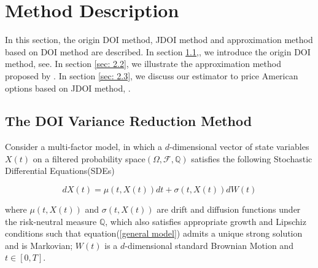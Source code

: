 \chapter{Method Description}

In this section, the origin DOI method, JDOI method and approximation method based on DOI method are described. In section \ref{sec: 2.1},, we introduce the origin DOI method, see\cite{heath_monte_nodate}. In section \ref{sec: 2.2}, we illustrate the approximation method proposed by \cite{kristensen_adding_2011}. In section \ref{sec: 2.3}, we discuss our estimator to price American options based on JDOI method, \cite{auster_jdoi_2021}.

\section{The DOI Variance Reduction Method}
\label{sec: 2.1}

Consider a multi-factor model, in which a $d$-dimensional vector of state variables $X(t)$ on a filtered probability space$(\Omega,\mathcal F, \mathbb Q)$ satisfies the following Stochastic Differential Equations(SDEs)

\begin{equation}\label{general model}
    dX(t) = \mu(t, X(t)) dt + \sigma(t, X(t)) dW(t)
\end{equation}

\noindent where $\mu(t,X(t))$ and $\sigma(t, X(t))$ are drift and diffusion functions under the risk-neutral measure $\mathbb Q$, which also satisfies appropriate growth and Lipschiz conditions such that equation(\ref{general model}) admits a unique strong solution and is Markovian; $W(t)$ is a $d$-dimensional standard Brownian Motion and $t \in [0,T]$.





